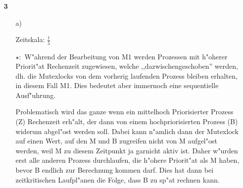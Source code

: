 \documentclass[a4paper,11pt]{article}
\begin{document}
\begin{enumerate}
\begin{itemize}
        \begin{center}
            \scalebox{0.5}{}
        \end{center}

\end{itemize}

\item[\textbf{3}]

\begin{itemize}
    \item[a)]

        Zeitskala: $\frac{t}{5}$

        \begin{figure}[h]
            \center
            \scalebox{0.4}{}
        \end{figure}

        $\star :$ W"ahrend der Bearbeitung von M1 werden Prozessen mit h"oherer Priorit"at Rechenzeit zugewiesen, welche ,,dazwischengeschoben'' werden, dh. die Mutexlocks von dem vorherig laufenden Prozess bleiben erhalten, in diesem Fall M1. Dies bedeutet aber immernoch eine sequentielle Ausf"uhrung.

        Problematisch wird das ganze wenn ein mittelhoch Priorisierter Prozess (Z) Rechenzeit erh"alt, der dann von einem hochpriorisierten Prozess (B) widerum abgel"ost werden soll. Dabei kann n"amlich dann der Mutexlock auf einen Wert, auf den M und B zugreifen nicht von M aufgel"ost werden, weil M zu diesem Zeitpunkt ja garnicht aktiv ist.
        Daher w"urden erst alle anderen Prozess durchlaufen, die h"ohere Priorit"at als M haben, bevor B endlich zur Berechnung kommen darf. Dies hat dann bei zeitkritischen Laufpl"anen die Folge, dass B zu sp"at rechnen kann.
    \end{itemize}

\end{enumerate}
\end{document}
